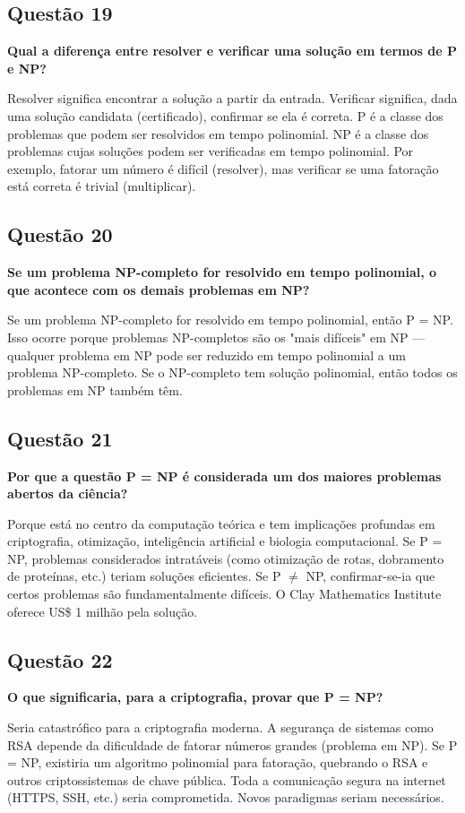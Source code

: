 \documentclass[conference]{IEEEtran}
\begin{document}
\subsection{Questão 19}
\textbf{Qual a diferença entre resolver e verificar uma solução em termos de P e NP?}

Resolver significa encontrar a solução a partir da entrada. Verificar significa, dada uma solução candidata (certificado), confirmar se ela é correta. P é a classe dos problemas que podem ser resolvidos em tempo polinomial. NP é a classe dos problemas cujas soluções podem ser verificadas em tempo polinomial. Por exemplo, fatorar um número é difícil (resolver), mas verificar se uma fatoração está correta é trivial (multiplicar).

\subsection{Questão 20}
\textbf{Se um problema NP-completo for resolvido em tempo polinomial, o que acontece com os demais problemas em NP?}

Se um problema NP-completo for resolvido em tempo polinomial, então P = NP. Isso ocorre porque problemas NP-completos são os "mais difíceis" em NP — qualquer problema em NP pode ser reduzido em tempo polinomial a um problema NP-completo. Se o NP-completo tem solução polinomial, então todos os problemas em NP também têm.

\subsection{Questão 21}
\textbf{Por que a questão P = NP é considerada um dos maiores problemas abertos da ciência?}

Porque está no centro da computação teórica e tem implicações profundas em criptografia, otimização, inteligência artificial e biologia computacional. Se P = NP, problemas considerados intratáveis (como otimização de rotas, dobramento de proteínas, etc.) teriam soluções eficientes. Se P $\neq$ NP, confirmar-se-ia que certos problemas são fundamentalmente difíceis. O Clay Mathematics Institute oferece US\$ 1 milhão pela solução.

\subsection{Questão 22}
\textbf{O que significaria, para a criptografia, provar que P = NP?}

Seria catastrófico para a criptografia moderna. A segurança de sistemas como RSA depende da dificuldade de fatorar números grandes (problema em NP). Se P = NP, existiria um algoritmo polinomial para fatoração, quebrando o RSA e outros criptossistemas de chave pública. Toda a comunicação segura na internet (HTTPS, SSH, etc.) seria comprometida. Novos paradigmas seriam necessários.
\end{document}
